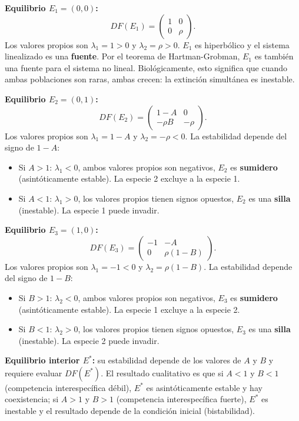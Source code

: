 \documentclass[11pt,letterpaper]{article}
\begin{document}
\textbf{Equilibrio $E_1=(0,0)$:}
\[
DF(E_1)=\begin{pmatrix}1 & 0\\ 0 & \rho\end{pmatrix}.
\]
Los valores propios son $\lambda_1=1>0$ y $\lambda_2=\rho>0$. $E_1$ es hiperbólico
y el sistema linealizado es una \textbf{fuente}. Por el teorema de Hartman-Grobman,
$E_1$ es también una fuente para el sistema no lineal. Biológicamente, esto significa
que cuando ambas poblaciones son raras, ambas crecen: la extinción simultánea es
inestable.

\textbf{Equilibrio $E_2=(0,1)$:}
\[
DF(E_2)=\begin{pmatrix}1-A & 0\\ -\rho B & -\rho\end{pmatrix}.
\]
Los valores propios son $\lambda_1=1-A$ y $\lambda_2=-\rho<0$. La estabilidad
depende del signo de $1-A$:
\begin{itemize}
    \item Si $A>1$: $\lambda_1<0$, ambos valores propios son negativos, $E_2$ es
          \textbf{sumidero} (asintóticamente estable). La especie 2 excluye a la especie 1.
    \item Si $A<1$: $\lambda_1>0$, los valores propios tienen signos opuestos, $E_2$
          es una \textbf{silla} (inestable). La especie 1 puede invadir.
\end{itemize}

\textbf{Equilibrio $E_3=(1,0)$:}
\[
DF(E_3)=\begin{pmatrix}-1 & -A\\ 0 & \rho(1-B)\end{pmatrix}.
\]
Los valores propios son $\lambda_1=-1<0$ y $\lambda_2=\rho(1-B)$. La estabilidad
depende del signo de $1-B$:
\begin{itemize}
    \item Si $B>1$: $\lambda_2<0$, ambos valores propios son negativos, $E_3$ es
          \textbf{sumidero} (asintóticamente estable). La especie 1 excluye a la especie 2.
    \item Si $B<1$: $\lambda_2>0$, los valores propios tienen signos opuestos, $E_3$
          es una \textbf{silla} (inestable). La especie 2 puede invadir.
\end{itemize}

\textbf{Equilibrio interior $E^*$:} su estabilidad depende de los valores de $A$
y $B$ y requiere evaluar $DF(E^*)$. El resultado cualitativo es que si $A<1$ y
$B<1$ (competencia interespecífica débil), $E^*$ es asintóticamente estable y
hay coexistencia; si $A>1$ y $B>1$ (competencia interespecífica fuerte), $E^*$
es inestable y el resultado depende de la condición inicial (bistabilidad).
\end{document}
